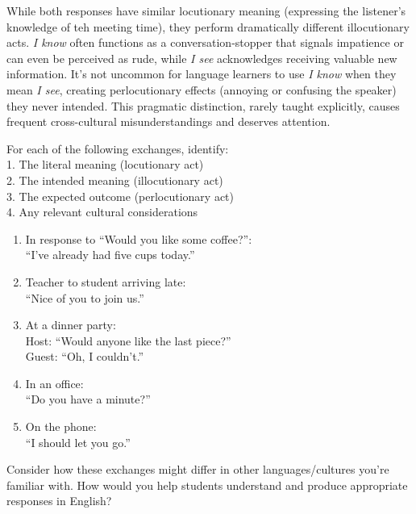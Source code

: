 \z
\z
While both responses have similar locutionary meaning (expressing the listener's knowledge of teh meeting time), they perform dramatically different illocutionary acts. \textit{I know} often functions as a conversation-stopper that signals impatience or can even be perceived as rude, while \textit{I see} acknowledges receiving valuable new information. It's not uncommon for language learners to use \textit{I know} when they mean \textit{I see}, creating perlocutionary effects (annoying or confusing the speaker) they never intended. This pragmatic distinction, rarely taught explicitly, causes frequent cross-cultural misunderstandings and deserves attention.

\begin{tcolorbox}[title=Practice: Analyzing Speech Acts, colback=white, parbox]
\setlength{\parindent}{1.5em}
\noindent For each of the following exchanges, identify:\\
\phantom{~~~}1. The literal meaning (locutionary act)\\
\phantom{~~~}2. The intended meaning (illocutionary act)\\
\phantom{~~~}3. The expected outcome (perlocutionary act)\\
\phantom{~~~}4. Any relevant cultural considerations
\begin{enumerate}[noitemsep]
    \item In response to ``Would you like some coffee?'':\\
    ``I've already had five cups today.''
    
    \item Teacher to student arriving late:\\
    ``Nice of you to join us.''
    
    \item At a dinner party:\\
    Host: ``Would anyone like the last piece?''\\
    Guest: ``Oh, I couldn't.''
    
    \item In an office:\\
    ``Do you have a minute?''
    
    \item On the phone:\\
    ``I should let you go.''
\end{enumerate}

Consider how these exchanges might differ in other languages/cultures you're familiar with. How would you help students understand and produce appropriate responses in English?
\end{tcolorbox}

